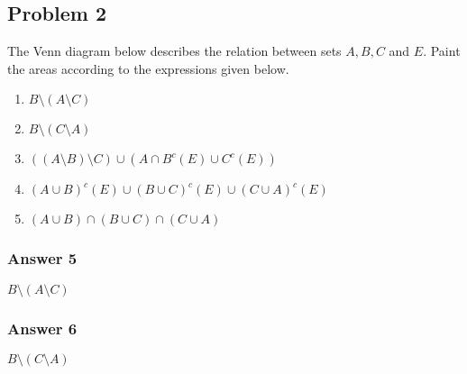 \documentclass[11pt]{article}
\begin{document}
\subsection{Problem 2}
\label{sec-1-2}
The Venn diagram below describes the relation between sets $A, B, C$ and $E$.
Paint the areas according to the expressions given below.

\begin{enumerate}
\item $B \setminus (A \setminus C)$
\item $B \setminus (C \setminus A)$
\item $((A \setminus B) \setminus C) \cup (A \cap B^c(E) \cup C^c(E))$
\item $(A \cup B)^c(E) \cup (B \cup C)^c(E) \cup (C \cup A)^c(E)$
\item $(A \cup B) \cap (B \cup C) \cap (C \cup A)$
\end{enumerate}

\def\firstcircle{(2,2.8) circle (1.2cm)}
\def\secondcircle{(4,2.8) circle (1.2cm)}
\def\thirdcircle{(3,1.4) circle (1.2cm)}
\def\background{(0,0) rectangle (6,4.2cm)}


\subsubsection{Answer 5}
\label{sec-1-2-1}
$B \setminus (A \setminus C)$

\subsubsection{Answer 6}
\label{sec-1-2-2}
$B \setminus (C \setminus A)$
\end{document}
